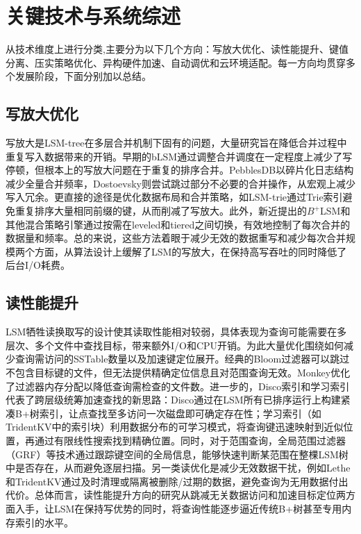 \documentclass[lang=cn,11pt,a4paper]{elegantpaper}
\begin{document}
\section{关键技术与系统综述}

从技术维度上进行分类,主要分为以下几个方向：写放大优化、读性能提升、键值分离、压实策略优化、异构硬件加速、自动调优和云环境适配。每一方向均贯穿多个发展阶段，下面分别加以总结。


\subsection{写放大优化}
写放大是LSM-tree在多层合并机制下固有的问题，大量研究旨在降低合并过程中重复写入数据带来的开销。早期的bLSM通过调整合并调度在一定程度上减少了写停顿，但根本上的写放大问题在于重复的排序合并。PebblesDB以碎片化日志结构减少全量合并频率，Dostoevsky则尝试跳过部分不必要的合并操作，从宏观上减少写入冗余。更直接的途径是优化数据布局和合并策略，如LSM-trie通过Trie索引避免重复排序大量相同前缀的键，从而削减了写放大。此外，新近提出的$B^+$LSM和其他混合策略引擎通过按需在leveled和tiered之间切换，有效地控制了每次合并的数据量和频率。总的来说，这些方法着眼于减少无效的数据重写和减少每次合并规模两个方面，从算法设计上缓解了LSM的写放大，在保持高写吞吐的同时降低了后台I/O耗费。
\subsection{读性能提升}

LSM牺牲读换取写的设计使其读取性能相对较弱，具体表现为查询可能需要在多层次、多个文件中查找目标，带来额外I/O和CPU开销。为此大量优化围绕如何减少查询需访问的SSTable数量以及加速键定位展开。经典的Bloom过滤器可以跳过不包含目标键的文件，但无法提供精确定位信息且对范围查询无效。Monkey优化了过滤器内存分配以降低查询需检查的文件数。进一步的，Disco索引和学习索引代表了跨层级统筹加速查找的新思路：Disco通过在LSM所有已排序运行上构建紧凑B+树索引，让点查找至多访问一次磁盘即可确定存在性；学习索引（如TridentKV中的索引块）利用数据分布的可学习模式，将查询键迅速映射到近似位置，再通过有限线性搜索找到精确位置。同时，对于范围查询，全局范围过滤器（GRF）等技术通过跟踪键空间的全局信息，能够快速判断某范围在整棵LSM树中是否存在，从而避免逐层扫描。另一类读优化是减少无效数据干扰，例如Lethe和TridentKV通过及时清理或隔离被删除/过期的数据，避免查询为无用数据付出代价。总体而言，读性能提升方向的研究从跳减无关数据访问和加速目标定位两方面入手，让LSM在保持写优势的同时，将查询性能逐步逼近传统B+树甚至专用内存索引的水平。
\end{document}
